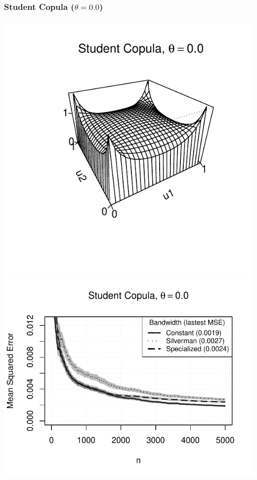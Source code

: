 \documentclass[aspectratio=169]{beamer}
\begin{document}
		\subsubsection{Student Copula ($ \theta = 0.0 $)}
			\begin{frame}
				\frametitle{\insertsubsubsection}
				
				\begin{flushleft}
					\includegraphics[width=0.4\linewidth]{plots/numerical_results/student0}
					\includegraphics[width=0.5\linewidth]{../text/plots/experiment_results/student0}
				\end{flushleft}
				
			\end{frame}
			
			
\end{document}
